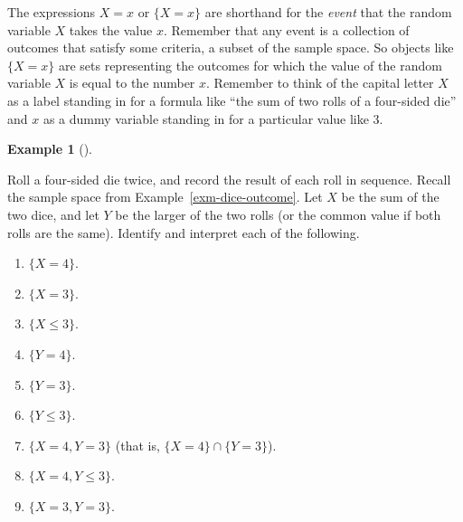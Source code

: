 \documentclass[
  letterpaper,
  DIV=11,
  numbers=noendperiod]{scrreprt}
\providecommand{\tightlist}{%
  \setlength{\itemsep}{0pt}\setlength{\parskip}{0pt}}
\theoremstyle{plain}
\theoremstyle{definition}
\newtheorem{example}{Example}[chapter]
\theoremstyle{definition}
\theoremstyle{definition}
\theoremstyle{remark}
\begin{document}
The expressions \(X=x\) or \(\{X=x\}\) are shorthand for the
\emph{event} that the random variable \(X\) takes the value \(x\).
Remember that any event is a collection of outcomes that satisfy some
criteria, a subset of the sample space. So objects like \(\{X=x\}\) are
sets representing the outcomes for which the value of the random
variable \(X\) is equal to the number \(x\). Remember to think of the
capital letter \(X\) as a label standing in for a formula like ``the sum
of two rolls of a four-sided die'' and \(x\) as a dummy variable
standing in for a particular value like 3.

\begin{tcolorbox}[enhanced jigsaw, opacityback=0, left=2mm, colframe=quarto-callout-note-color-frame, toprule=.15mm, breakable, colback=white, leftrule=.75mm, arc=.35mm, rightrule=.15mm, bottomrule=.15mm]

\begin{example}[]\protect\hypertarget{exm-dice-rv-event}{}\label{exm-dice-rv-event}

Roll a four-sided die twice, and record the result of each roll in
sequence. Recall the sample space from Example~\ref{exm-dice-outcome}.
Let \(X\) be the sum of the two dice, and let \(Y\) be the larger of the
two rolls (or the common value if both rolls are the same). Identify and
interpret each of the following.

\begin{enumerate}
\def\labelenumi{\arabic{enumi}.}
\tightlist
\item
  \(\{X = 4\}\).
\item
  \(\{X = 3\}\).
\item
  \(\{X \le 3\}\).
\item
  \(\{Y = 4\}\).
\item
  \(\{Y = 3\}\).
\item
  \(\{Y \le 3\}\).
\item
  \(\{X = 4, Y = 3\}\) (that is, \(\{X = 4\}\cap \{Y = 3\}\)).
\item
  \(\{X = 4, Y \le 3\}\).
\item
  \(\{X = 3, Y = 3\}\).
\end{enumerate}

\end{example}

\end{tcolorbox}
\end{document}
